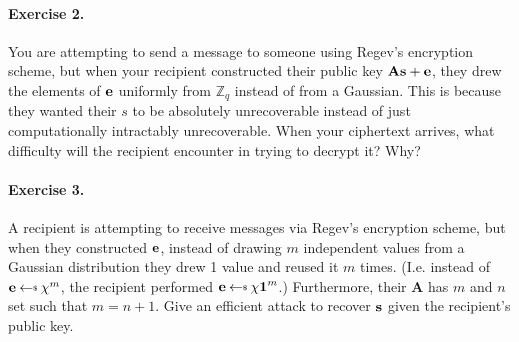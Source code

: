 \paragraph{Exercise 2.}
You are attempting to send a message to someone using Regev's encryption scheme, 
but when your recipient constructed their public key $\textbf{A}\mathbf{s} + {{\bf e}}$, 
they drew the elements of ${{\bf e}}$ uniformly from $\mathbb{Z}_q$ instead of from 
a Gaussian. This is because they wanted their $s$ to be absolutely unrecoverable 
instead of just computationally intractably unrecoverable. When your ciphertext 
arrives, what difficulty will the recipient encounter in trying to decrypt it? 
Why?

\paragraph{Exercise 3.}
A recipient is attempting to receive messages via Regev's encryption scheme, but 
when they constructed ${{\bf e}}$, instead of drawing $m$ independent values from a 
Gaussian distribution they drew 1 value and reused it $m$ times. (I.e. instead 
of $\vece \getsr \chi^m$, the recipient performed $\vece \getsr \chi 
\textbf{1}^m$.) Furthermore, their $\textbf{A}$ has $m$ and $n$ set such that 
$m=n+1$. Give an efficient attack to recover $\mathbf{s}$ given the recipient's 
public key.
